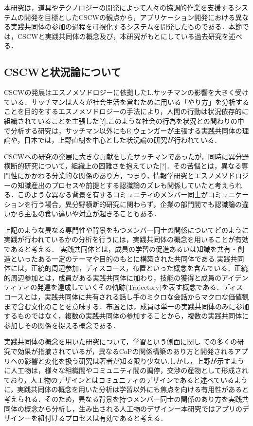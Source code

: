 \documentclass[submit,techrep]{ipsj}
\begin{document}
本研究は，道具やテクノロジーの開発によって人々の協調的作業を支援するシステムの開発を目標としたCSCWの観点から\cite{book6}，アプリケーション開発における異なる実践共同体の参加の過程を可視化するシステムを開発したものである．本節では，CSCWと実践共同体の概念及び，本研究がもとにしている過去研究を述べる．

\subsection{CSCWと状況論について}
CSCWの発展はエスノメソドロジーに依拠したL.サッチマンの影響を大きく受けている．サッチマンは人々が社会生活を営むために用いる「やり方」\cite{book3}を分析することを目的をするエスノメソドロジーの手法により，人間の行動は状況依存的に組織されていることを主張した[?].このような社会の行為を状況との関わりの中で分析する研究は，サッチマン以外にもE.ウェンガーが主張する実践共同体\cite{book7}の理論や，日本では，上野直樹を中心とした状況論の研究が行われている\cite{book8}．

CSCWへの研究の発展に大きな貢献をしたサッチマンであったが，同時に異分野横断的研究について，組織上の困難さを抱えていた[?]．その苦悩とは，異なる専門性にかかわる分業的な関係のあり方，つまり，情報学研究とエスノメソドロジーの知識産出のプロセスや前提とする認識論のズレも関係していたと考えられる\cite{book3}．このような異なる背景を有するコミュニティのメンバー同士がコミュニケーションを行う場合，異分野横断的研究に関わらず，企業の部門間でも認識論の違いから主張の食い違いや対立が起きることもある\cite{book4}．

上記のような異なる専門性や背景をもつメンバー同士の関係についてどのように実践が行われているかの分析を行うには，実践共同体の概念を用いることが有効であると考える．
実践共同体とは，成員の学習の促進あるいは知識を共有・創造といったある一定のテーマや目的のもとに構築された共同体である\cite{book5}.実践共同体には，正統的周辺参加，ディスコース，布置といった概念を含んでいる．正統的周辺参加とは，成員がある実践共同体に加わり，技能の獲得と成員のアイデンティティの発達を達成していくその軌跡(Trajectory)を表す概念である．ディスコースとは，実践共同体に共有される話し手のミクロな会話からマクロな価値観まで含む文化のことを意味する\cite{book2}．布置とは，成員は単一の実践共同体のみに参加するものではなく，複数の実践共同体の参加することから，複数の実践共同体に参加しその関係を捉える概念である．

実践共同体の概念を用いた研究について，学習という側面に関し ての多くの研究で効果が指摘されているが，異なるCoPの関係構築のあり方と開発されるアプリへの影響と変化を扱う研究は著者が知る限り少ない.しかし，上野\cite{book1}が示すように人工物は，様々な組織間やコミュニティ間の調停，交渉の産物として形成されており，人工物のデザインとはコミュニティのデザインであると述べているように，実践共同体の概念を用いた分析は学習以外にも焦点を向ける有用性があると考えられる．そのため，異なる背景を持つメンバー同士の関係のあり方を実践共同体の概念から分析し，生み出される人工物のデザインー本研究ではアプリのデザインーを紐付けるプロセスは有効であると考える．
\end{document}
